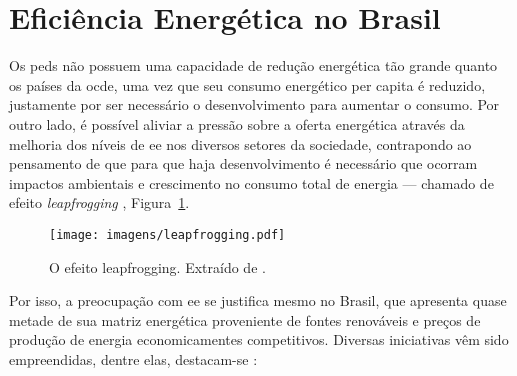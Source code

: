 \section{Eficiência Energética no Brasil}
\label{sec:ee_brasil}

Os \glspl{ped} não possuem uma capacidade de redução energética tão grande
quanto os países da \gls{ocde}, uma vez que seu consumo energético per capita é
reduzido, justamente por ser necessário o desenvolvimento para aumentar o
consumo. Por outro lado, é possível aliviar a pressão sobre a
oferta energética através da melhoria dos níveis de \gls{ee} nos
diversos setores da sociedade, contrapondo ao pensamento de que para que
haja desenvolvimento é necessário que ocorram impactos ambientais e crescimento no
consumo total de energia --- chamado de efeito \emph{leapfrogging}
\cite{goldemberg}, Figura~\ref{fig:leapfrogging}. 

\begin{figure}[h!t]
\centering
\texttt{[image: imagens/leapfrogging.pdf]}
\caption[O efeito leapfrogging.]
{O efeito leapfrogging. Extraído de \cite{goldemberg}.}
\label{fig:leapfrogging}
\end{figure}

Por isso, a preocupação com \gls{ee} se justifica mesmo no Brasil, 
que apresenta quase metade de sua matriz energética proveniente de fontes 
renováveis e preços de produção de energia economicamentes competitivos.
Diversas iniciativas vêm sido empreendidas, dentre elas, destacam-se
\cite{pnef,pne30_eff_energ,epe_demanda_2012,epe_slides_eficiencia}:

